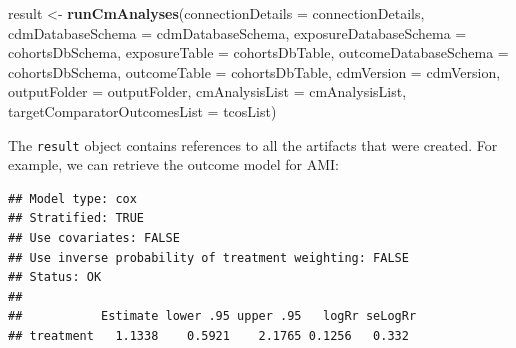 \documentclass[11pt]{book}
\newenvironment{Shaded}{\begin{snugshade}}{\end{snugshade}}
\newcommand{\KeywordTok}[1]{\textcolor[rgb]{0.13,0.29,0.53}{\textbf{#1}}}
\newcommand{\DataTypeTok}[1]{\textcolor[rgb]{0.13,0.29,0.53}{#1}}
\newcommand{\DecValTok}[1]{\textcolor[rgb]{0.00,0.00,0.81}{#1}}
\newcommand{\StringTok}[1]{\textcolor[rgb]{0.31,0.60,0.02}{#1}}
\newcommand{\OperatorTok}[1]{\textcolor[rgb]{0.81,0.36,0.00}{\textbf{#1}}}
\newcommand{\NormalTok}[1]{#1}
\begin{document}
\begin{Shaded}
\begin{Highlighting}[]
\NormalTok{result <-}\StringTok{ }\KeywordTok{runCmAnalyses}\NormalTok{(}\DataTypeTok{connectionDetails =}\NormalTok{ connectionDetails,}
                        \DataTypeTok{cdmDatabaseSchema =}\NormalTok{ cdmDatabaseSchema,}
                        \DataTypeTok{exposureDatabaseSchema =}\NormalTok{ cohortsDbSchema,}
                        \DataTypeTok{exposureTable =}\NormalTok{ cohortsDbTable,}
                        \DataTypeTok{outcomeDatabaseSchema =}\NormalTok{ cohortsDbSchema,}
                        \DataTypeTok{outcomeTable =}\NormalTok{ cohortsDbTable,}
                        \DataTypeTok{cdmVersion =}\NormalTok{ cdmVersion,}
                        \DataTypeTok{outputFolder =}\NormalTok{ outputFolder,}
                        \DataTypeTok{cmAnalysisList =}\NormalTok{ cmAnalysisList,}
                        \DataTypeTok{targetComparatorOutcomesList =}\NormalTok{ tcosList)}
\end{Highlighting}
\end{Shaded}

The \texttt{result} object contains references to all the artifacts that
were created. For example, we can retrieve the outcome model for AMI:

\begin{Shaded}
\end{Shaded}

\begin{verbatim}
## Model type: cox
## Stratified: TRUE
## Use covariates: FALSE
## Use inverse probability of treatment weighting: FALSE
## Status: OK
## 
##           Estimate lower .95 upper .95   logRr seLogRr
## treatment   1.1338    0.5921    2.1765 0.1256   0.332
\end{verbatim}
\end{document}

